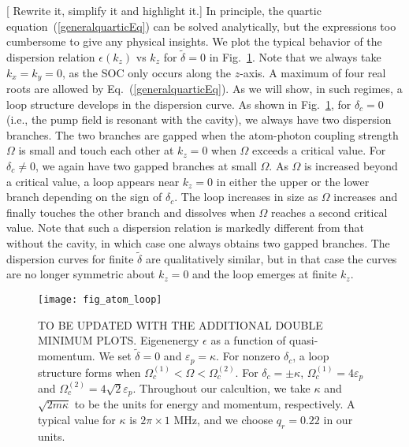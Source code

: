 \documentclass[journal,article,accept,moreauthors,pdftex,12pt,a4paper]{mdpi}
\begin{document}
[{\color{red} Rewrite it, simplify it and highlight it.}] In principle, the quartic equation~(\ref{generalquarticEq}) can be solved analytically, but the expressions too cumbersome to give any physical insights. We plot the typical behavior of the dispersion relation $\epsilon({ k_z})$ vs $k_z$ for $\tilde{\delta}=0$ in Fig.~\ref{atomloops}. Note that we always take $k_x =k_y=0$, as the SOC only occurs along the $z$-axis. A maximum of four real roots are allowed by Eq.~(\ref{generalquarticEq}). As we will show, in such regimes, a loop structure develops in the dispersion curve.
As shown in Fig.~\ref{atomloops}, for $\delta_c=0$ (i.e., the pump field is resonant with the cavity), we always have two dispersion branches. The two branches are gapped when the atom-photon coupling strength $\Omega$ is small and touch each other at $k_z=0$ when $\Omega$ exceeds a critical value. For $\delta_c \neq 0$, we again have two gapped branches at small $\Omega$. As $\Omega$ is increased beyond a critical value, a loop appears near $k_z=0$ in either the upper or the lower branch depending on the sign of $\delta_c$. The loop increases in size as $\Omega$ increases and finally touches the other branch and dissolves when $\Omega$ reaches a second critical value. Note that such a dispersion relation is markedly different from that without the cavity, in which case one always obtains two gapped branches. The dispersion curves for finite $\tilde{\delta}$ are qualitatively similar, but in that case the curves are no longer symmetric about $k_z=0$ and the loop emerges  at finite $k_z$. 

\begin{figure}[htp]
\texttt{[image: fig\_atom\_loop]}\caption{{\color{red} TO BE UPDATED WITH THE ADDITIONAL DOUBLE MINIMUM PLOTS.} Eigenenergy $\epsilon$ as a function of quasi-momentum. We set $\tilde{\delta}=0$ and $\varepsilon_p=\kappa$. For nonzero $\delta_c$, a loop structure forms when $\Omega_c^{(1)} < \Omega < \Omega_c ^{(2)}$. For $\delta_c=\pm\kappa$, $\Omega_c^{(1)}=4\varepsilon_p$ and $\Omega_c^{(2)}= 4\sqrt{2}\varepsilon_p$. Throughout our calcultion, we take $\kappa$ and $\sqrt{2m\kappa}$ to be the units for energy and momentum, respectively. A typical value for $\kappa$ is $2\pi \times 1$ MHz, and we choose $q_r=0.22$ in our units. }\label{atomloops}
\end{figure}
\end{document}
